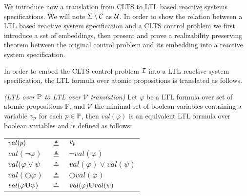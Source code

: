 
We introduce now a translation from CLTS to LTL based reactive systems specifications. We will note $\Sigma \setminus {\mathcal{C}}$ as ${\mathcal{U}}$. In order to show the relation between a LTL based reactive system specification and a CLTS control problem we first introduce a set of embeddings, then present and prove a realizability preserving theorem between the original control problem and its embedding into a reactive system specification.


In order to embed the CLTS control problem ${\mathcal{I}}$ into a LTL reactive system specification, the LTL formula over atomic propositions is translated as follows.
\begin{definition}
	\label{def:val_ltl} \emph{(LTL over ${\mathbb{P}}$ to LTL over $\mathcal{V}$ translation)} 
	Let $\varphi$ be a LTL formula over set of atomic propositions ${\mathbb{P}}$, and $\mathcal{V}$ the minimal set of boolean variables containing a variable $v_{{p}}$ for each ${p} \in {\mathbb{P}}$, then $val(\varphi)$ is an equivalent LTL formula over boolean variables and is defined as follows:\\
	
	\begin{tabular}{ l c l }
		$val({p})$ & $\triangleq$ & $v_{{p}}$\\	
		$val(\neg \varphi)$ & $\triangleq$ & $\neg val(\varphi)$\\
		$val(\varphi \vee \psi$ & $\triangleq$ & $val(\varphi) \vee val(\psi)$\\
		$val(\bigcirc \varphi)$ & $\triangleq$ & $\bigcirc val(\varphi)$\\
		$val(\varphi {\bf U} \psi)$ & $\triangleq$ & $val(\varphi) {\bf U} val(\psi)$\\
	\end{tabular}	
\end{definition}

